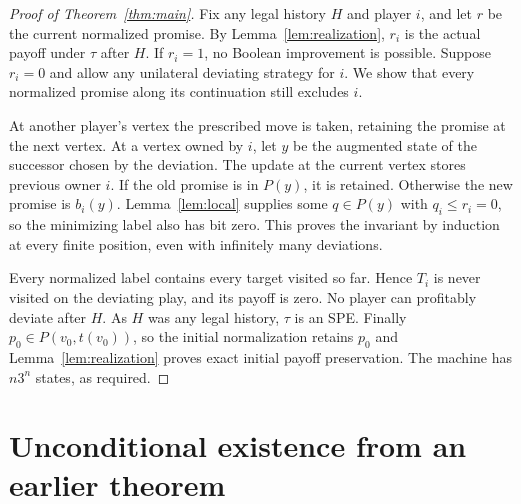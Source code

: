 \documentclass[acmlarge,11pt,screen,nonacm,natbib=false]{acmart}
\theoremstyle{remark}
\begin{document}
\begin{proof}[Proof of Theorem~\ref{thm:main}]
Fix any legal history $H$ and player $i$, and let $r$ be the current
normalized promise. By Lemma~\ref{lem:realization}, $r_i$ is the actual
payoff under $\tau$ after $H$. If $r_i=1$, no Boolean improvement is possible.
Suppose $r_i=0$ and allow any unilateral deviating strategy for $i$.
We show that every normalized promise along its continuation still excludes $i$.

At another player's vertex the prescribed move is taken, retaining the
promise at the next vertex. At a vertex owned by $i$, let $y$ be the
augmented state of the successor chosen by the deviation. The update at
the current vertex stores previous owner $i$. If the old promise is in
$P(y)$, it is retained. Otherwise the new promise is $b_i(y)$.
Lemma~\ref{lem:local} supplies some $q\in P(y)$ with $q_i\leq r_i=0$,
so the minimizing label also has bit zero. This proves the invariant by
induction at every finite position, even with infinitely many deviations.

Every normalized label contains every target visited so far. Hence $T_i$
is never visited on the deviating play, and its payoff is zero. No player
can profitably deviate after $H$. As $H$ was any legal history, $\tau$ is
an SPE. Finally $p_0\in P(v_0,t(v_0))$, so the initial normalization retains
$p_0$ and Lemma~\ref{lem:realization} proves exact initial payoff preservation.
The machine has $n3^n$ states, as required.
\end{proof}

\section{Unconditional existence from an earlier theorem}\label{sec:existence}
\end{document}
